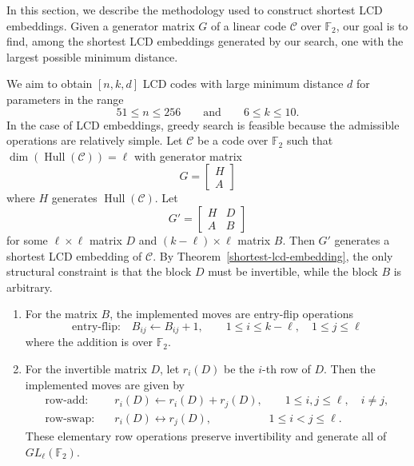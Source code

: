 \documentclass{article}
\theoremstyle{definition}
\theoremstyle{remark}
\begin{document}
In this section, we describe the methodology used to construct shortest LCD embeddings. Given a generator matrix $G$ of a linear code $\mathcal{C}$ over $\mathbb{F}_2$, our goal is to find, among the shortest LCD embeddings generated by our search, one with the largest possible minimum distance.

We aim to obtain $[n, k, d]$ LCD codes with large minimum distance $d$ for parameters in the range
\[
    51\leq n\leq 256
    \qquad\text{and}\qquad
    6\leq k\leq 10.
\]
In the case of LCD embeddings, greedy search is feasible because the admissible operations are relatively simple. Let $\mathcal{C}$ be a code over $\mathbb{F}_2$ such that $\dim(\operatorname{Hull}(\mathcal{C}))=\ell$ with generator matrix
\[
G=\begin{bmatrix}
    H\\
    A
\end{bmatrix}
\]
where $H$ generates $\operatorname{Hull}(\mathcal{C})$. Let
\[
G'=\begin{bmatrix}
H & D\\
A & B
\end{bmatrix}
\]
for some $\ell\times \ell$ matrix $D$ and $(k-\ell)\times \ell$ matrix $B$. Then $G'$ generates a shortest LCD embedding of $\mathcal{C}$. By Theorem~\ref{shortest-lcd-embedding}, the only structural constraint is that the block $D$ must be invertible, while the block $B$ is arbitrary.
\begin{enumerate}
    \item For the matrix $B$, the implemented moves are entry-flip operations
    \[
        \text{entry-flip:}\quad B_{ij}\leftarrow B_{ij}+1,
        \qquad
        1\leq i\leq k-\ell,\quad 1\leq j\leq \ell
    \]
    where the addition is over $\mathbb{F}_2$.
    \item For the invertible matrix $D$, let $r_i(D)$ be the $i$-th row of $D$. Then the implemented moves are given by
    \begin{align*}
        \text{row-add:}\quad
        & r_i(D)\leftarrow r_i(D)+r_j(D),
        \qquad 1\leq i,j\leq \ell,\quad i\neq j,\\
        \text{row-swap:}\quad
        & r_i(D)\leftrightarrow r_j(D),
        \qquad\qquad~~~~~ 1\leq i<j\leq \ell.
    \end{align*}
    These elementary row operations preserve invertibility and generate all of $GL_\ell(\mathbb{F}_2)$.
\end{enumerate}
\end{document}
